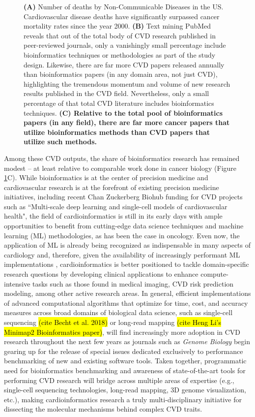 \documentclass[letter]{bioinfo}
\begin{document}
\begin{figure}[!tpb]
	\caption{\textbf{(A)} Number of deaths by Non-Communicable Diseases in the US.  Cardiovascular disease deaths have significantly surpassed cancer mortality rates since the year 2000.  \textbf{(B)} Text mining PubMed reveals that out of the total body of CVD research published in peer-reviewed journals, only a vanishingly small percentage include bioinformatics techniques or methodologies as part of the study design.  Likewise, there are far more CVD papers released annually than bioinformatics papers (in any domain area, not just CVD), highlighting the tremendous momentum and volume of new research results published in the CVD field.  Nevertheless, only a small percentage of that total CVD literature includes bioinformatics techniques.  \textbf{(C) Relative to the total pool of bioinformatics papers (in any field), there are far more cancer papers that utilize bioinformatics methods than CVD papers that utilize such methods.}}
	\label{fig:figure1}
\end{figure}


Among these CVD outputs, the share of bioinformatics research has remained modest -- at least relative to comparable work done in cancer biology (Figure \ref{fig:figure1}C). While bioinformatics is at the center of precision medicine \citep{Gomez-Lopez:2017:Precision} and cardiovascular research is at the forefront of existing precision medicine initiatives, including recent Chan Zuckerberg Biohub funding for CVD projects such as ``Multi-scale deep learning and single-cell models of cardiovascular health", the field of cardioinformatics is still in its early days with ample opportunities to benefit from cutting-edge data science techniques and machine learning (ML) methodologies, as has been the case in oncology.  Even now, the application of ML is already being recognized as indispensable in many aspects of cardiology \citep{Shameer:2017:Translational,Shameer:2018:Machine} and, therefore, given the availability of increasingly performant ML implementations \citep{MLPerf:2018:MLPerf}, cardioinformatics is better positioned to tackle domain-specific research questions by developing clinical applications to enhance compute-intensive tasks such as those found in medical imaging, CVD risk prediction modeling, among other active research areas. In general, efficient implementations of advanced computational algorithms that optimize for time, cost, and accuracy measures across broad domains of biological data science, such as single-cell sequencing \hl{(cite Becht et al. 2018)} or long-read mapping \hl{(cite Heng Li's Minimap2 Bioinformatics paper)}, will find increasingly more adoption in CVD research throughout the next few years as journals such as \emph{Genome Biology} begin gearing up for the release of special issues dedicated exclusively to performance benchmarking of new and existing software tools.  Taken together, programmatic need for bioinformatics benchmarking and awareness of state-of-the-art tools for performing CVD research will bridge across multiple areas of expertise (e.g., single-cell sequencing technologies, long-read mapping, 3D genome visualization, etc.), making cardioinformatics research a truly multi-disciplinary initiative for dissecting the molecular mechanisms behind complex CVD traits.   
\end{document}
